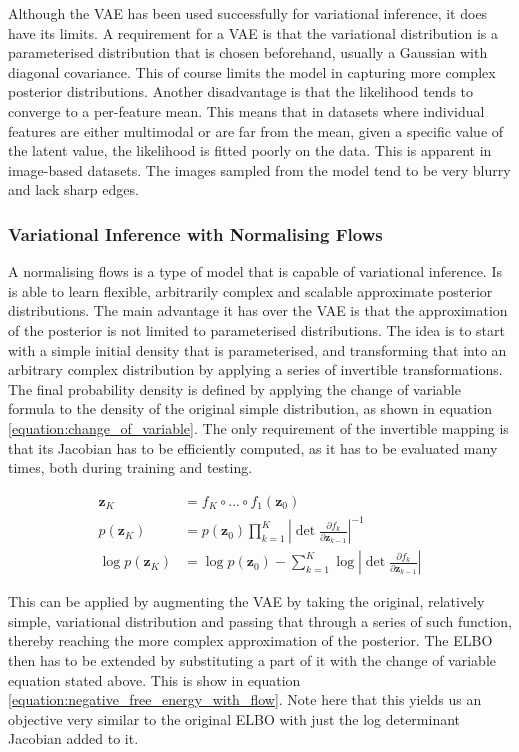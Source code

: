 \documentclass{article}
\newcommand{\bz}{\mathbf{z}}
\newcommand{\parfrac}[2]{\frac{\partial #1}{\partial#2}}
\begin{document}
Although the VAE has been used successfully for variational inference, it does have its limits. A requirement for a VAE is that the variational distribution is a parameterised distribution that is chosen beforehand, usually a Gaussian with diagonal covariance. This of course limits the model in capturing more complex posterior distributions. Another disadvantage is that the likelihood tends to converge to a per-feature mean. This means that in datasets where individual features are either multimodal or are far from the mean, given a specific value of the latent value, the likelihood is fitted poorly on the data. This is apparent in image-based datasets. The images sampled from the model tend to be very blurry and lack sharp edges.

\subsubsection*{Variational Inference with Normalising Flows}
A normalising flows is a type of model that is capable of variational inference. Is is able to learn flexible, arbitrarily complex and scalable approximate posterior distributions. The main advantage it has over the VAE is that the approximation of the posterior is not limited to parameterised distributions. The idea is to start with a simple initial density that is parameterised, and transforming that into an arbitrary complex distribution by applying a series of invertible transformations. The final probability density is defined by applying the change of variable formula to the density of the original simple distribution, as shown in equation \ref{equation:change_of_variable}. The only requirement of the invertible mapping is that its Jacobian has to be efficiently computed, as it has to be evaluated many times, both during training and testing.

\begin{align}\label{equation:change_of_variable}
    \bz_K &= f_K \circ ... \circ f_1 (\bz_0)\\
    p(\bz_K) &= p(\bz_0) \prod\limits_{k=1}^K \left|\det \parfrac{f_k}{\bz_{k-1}} \right|^{-1}\\
    \log p(\bz_K) &= \log p(\bz_0) - \sum\limits_{k=1}^K \log \left|\det \parfrac{f_k}{\bz_{k-1}} \right|
\end{align}

\noindent
This can be applied by augmenting the VAE by taking the original, relatively simple, variational distribution and passing that through a series of such function, thereby reaching the more complex approximation of the posterior. The ELBO then has to be extended by substituting a part of it with the change of variable equation stated above. This is show in equation \ref{equation:negative_free_energy_with_flow}. Note here that this yields us an objective very similar to the original ELBO with just the log determinant Jacobian added to it.
\end{document}
